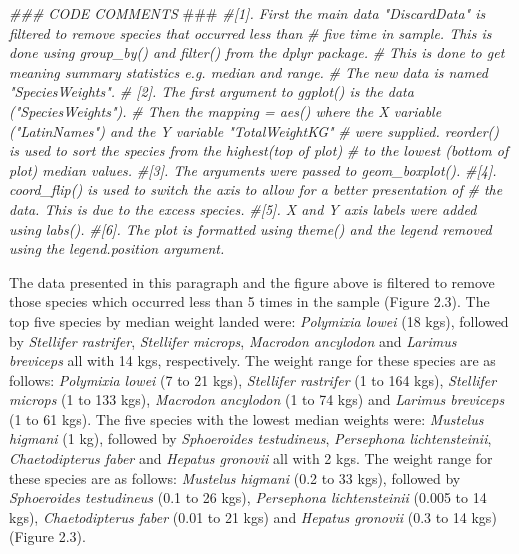\documentclass[
]{book}
\newenvironment{Shaded}{\begin{snugshade}}{\end{snugshade}}
\newcommand{\AlertTok}[1]{\textcolor[rgb]{0.94,0.16,0.16}{#1}}
\newcommand{\CommentTok}[1]{\textcolor[rgb]{0.56,0.35,0.01}{\textit{#1}}}
\begin{document}
\begin{Shaded}
\begin{Highlighting}[]
\CommentTok{### CODE COMMENTS }\AlertTok{###}
\CommentTok{#[1]. First the main data "DiscardData" is filtered to remove species that occurred less than }
\CommentTok{#     five time in sample. This is done using group_by() and filter() from the dplyr package.}
\CommentTok{#     This is done to get meaning summary statistics e.g. median and range. }
\CommentTok{#     The new data is named "SpeciesWeights".   }
\CommentTok{# [2]. The first argument to ggplot() is the data ("SpeciesWeights"). }
\CommentTok{#     Then the mapping = aes() where the X variable ("LatinNames") and the Y variable "TotalWeightKG"}
\CommentTok{#     were supplied. reorder() is used to sort the species from the highest(top of plot) }
\CommentTok{#     to the lowest (bottom of plot) median values.   }
\CommentTok{#[3]. The arguments were passed to geom_boxplot().}
\CommentTok{#[4]. coord_flip() is used to switch the axis to allow for a better presentation of }
\CommentTok{#     the data. This is due to the excess species. }
\CommentTok{#[5]. X and Y axis labels were added using labs().}
\CommentTok{#[6]. The plot is formatted using theme() and the legend removed using the legend.position argument.}
\end{Highlighting}
\end{Shaded}

The data presented in this paragraph and the figure above is filtered to remove those species which occurred less than 5 times in the sample (Figure 2.3). The top five species by median weight landed were: \emph{Polymixia lowei} (18 kgs), followed by \emph{Stellifer rastrifer}, \emph{Stellifer microps}, \emph{Macrodon ancylodon} and \emph{Larimus breviceps} all with 14 kgs, respectively. The weight range for these species are as follows: \emph{Polymixia lowei} (7 to 21 kgs), \emph{Stellifer rastrifer} (1 to 164 kgs), \emph{Stellifer microps} (1 to 133 kgs), \emph{Macrodon ancylodon} (1 to 74 kgs) and \emph{Larimus breviceps} (1 to 61 kgs). The five species with the lowest median weights were: \emph{Mustelus higmani} (1 kg), followed by \emph{Sphoeroides testudineus}, \emph{Persephona lichtensteinii}, \emph{Chaetodipterus faber} and \emph{Hepatus gronovii} all with 2 kgs. The weight range for these species are as follows: \emph{Mustelus higmani} (0.2 to 33 kgs), followed by \emph{Sphoeroides testudineus} (0.1 to 26 kgs), \emph{Persephona lichtensteinii} (0.005 to 14 kgs), \emph{Chaetodipterus faber} (0.01 to 21 kgs) and \emph{Hepatus gronovii} (0.3 to 14 kgs) (Figure 2.3).
\end{document}
